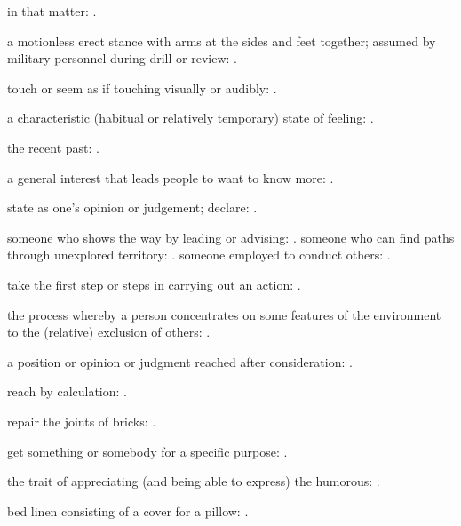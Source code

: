   in that matter:   .

  a motionless erect stance with arms at the sides and feet together; assumed by military personnel during drill or review: .

  touch or seem as if touching visually or audibly:   .

  a characteristic (habitual or relatively temporary) state of feeling:   .

  the recent past: .

  a general interest that leads people to want to know more: .

  state as one's opinion or judgement; declare: .

  someone who shows the way by leading or advising: . someone who can find paths through unexplored territory:   . someone employed to conduct others:   .

  take the first step or steps in carrying out an action:   .

  the process whereby a person concentrates on some features of the environment to the (relative) exclusion of others:   .

  a position or opinion or judgment reached after consideration:   .

  reach by calculation: .

  repair the joints of bricks:   .

  get something or somebody for a specific purpose:   .

  the trait of appreciating (and being able to express) the humorous:   .

  bed linen consisting of a cover for a pillow:   .


